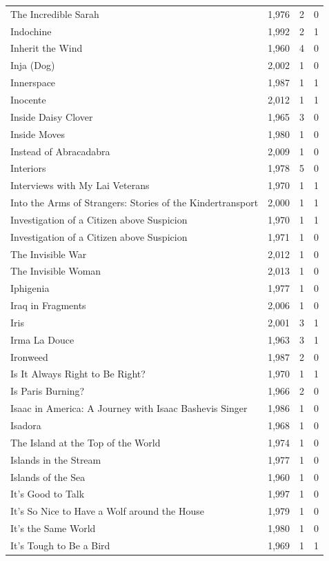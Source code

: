 \begin{tabular}{lrrr}
The Incredible Sarah & 1,976 & 2 & 0 \\
Indochine & 1,992 & 2 & 1 \\
Inherit the Wind & 1,960 & 4 & 0 \\
Inja (Dog) & 2,002 & 1 & 0 \\
Innerspace & 1,987 & 1 & 1 \\
Inocente & 2,012 & 1 & 1 \\
Inside Daisy Clover & 1,965 & 3 & 0 \\
Inside Moves & 1,980 & 1 & 0 \\
Instead of Abracadabra & 2,009 & 1 & 0 \\
Interiors & 1,978 & 5 & 0 \\
Interviews with My Lai Veterans & 1,970 & 1 & 1 \\
Into the Arms of Strangers: Stories of the Kindertransport & 2,000 & 1 & 1 \\
Investigation of a Citizen above Suspicion & 1,970 & 1 & 1 \\
Investigation of a Citizen above Suspicion & 1,971 & 1 & 0 \\
The Invisible War & 2,012 & 1 & 0 \\
The Invisible Woman & 2,013 & 1 & 0 \\
Iphigenia & 1,977 & 1 & 0 \\
Iraq in Fragments & 2,006 & 1 & 0 \\
Iris & 2,001 & 3 & 1 \\
Irma La Douce & 1,963 & 3 & 1 \\
Ironweed & 1,987 & 2 & 0 \\
Is It Always Right to Be Right? & 1,970 & 1 & 1 \\
Is Paris Burning? & 1,966 & 2 & 0 \\
Isaac in America: A Journey with Isaac Bashevis Singer & 1,986 & 1 & 0 \\
Isadora & 1,968 & 1 & 0 \\
The Island at the Top of the World & 1,974 & 1 & 0 \\
Islands in the Stream & 1,977 & 1 & 0 \\
Islands of the Sea & 1,960 & 1 & 0 \\
It's Good to Talk & 1,997 & 1 & 0 \\
It's So Nice to Have a Wolf around the House & 1,979 & 1 & 0 \\
It's the Same World & 1,980 & 1 & 0 \\
It's Tough to Be a Bird & 1,969 & 1 & 1 \\

\end{tabular}
